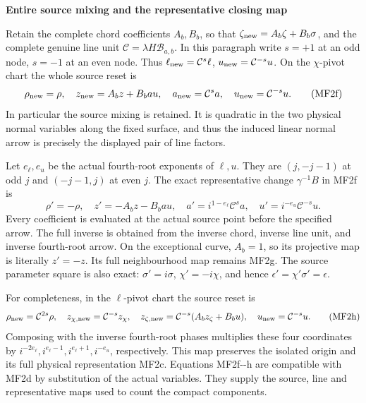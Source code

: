 \par

\medskip\noindent\textbf{Entire source mixing and the representative closing map}

\par\nobreak

Retain the complete chord coefficients \(A_b,B_b\), so that
\(\zeta_{\rm new}=A_b\zeta+B_b\sigma\), and the complete genuine
line unit \(\mathcal C=\lambda H\mathcal B_{a,b}\). In this
paragraph write \(s=+1\) at an odd node, \(s=-1\) at an even
node. Thus \(\ell_{\rm new}=\mathcal C^s\ell\),
\(u_{\rm new}=\mathcal C^{-s}u\). On the \(\chi\)-pivot chart
the whole source reset is
\[
 \rho_{\rm new}=\rho,\quad
 z_{\rm new}=A_bz+B_bau,\quad
 a_{\rm new}=\mathcal C^s a,\quad
 u_{\rm new}=\mathcal C^{-s}u.
\tag{MF2f}
\]
In particular the source mixing is retained. It is quadratic in the two
physical normal variables along the fixed surface, and thus the induced
linear normal arrow is precisely the displayed pair of line factors.

Let \(e_\ell,e_u\) be the actual fourth-root exponents of \(\ell,u\).
They are \((j,-j-1)\) at odd \(j\) and \((-j-1,j)\) at even
\(j\). The exact representative change \(\gamma^{-1}B\) in
MF2f is
\[
 \rho'=-\rho,\quad z'=-A_bz-B_bau,\quad
 a'=i^{1-e_\ell}\mathcal C^s a,\quad
 u'=i^{-e_u}\mathcal C^{-s}u.
\tag{MF2g}
\]
Every coefficient is evaluated at the actual source point before the
specified arrow. The full inverse is obtained from the inverse chord,
inverse line unit, and inverse fourth-root arrow. On the exceptional
curve, \(A_b=1\), so its projective map is literally \(z'=-z\).
Its full neighbourhood map remains MF2g. The source parameter square is
also exact: \(\sigma'=i\sigma\), \(\chi'=-i\chi\), and hence
\(\epsilon'=\chi'\sigma'=\epsilon\).

For completeness, in the \(\ell\)-pivot chart the source reset is
\[
 \rho_{\rm new}=\mathcal C^{2s}\rho,\quad
 z_{\chi,{\rm new}}=\mathcal C^{-s}z_\chi,\quad
 z_{\zeta,{\rm new}}=\mathcal C^{-s}(A_bz_\zeta+B_bu),\quad
 u_{\rm new}=\mathcal C^{-s}u.
\tag{MF2h}
\]
Composing with the inverse fourth-root phases multiplies these four
coordinates by \(i^{-2e_\ell},i^{e_\ell-1},i^{e_\ell+1},
i^{-e_u}\), respectively. This map preserves the isolated origin
and its full physical representation MF2c. Equations MF2f-\/-h are
compatible with MF2d by substitution of the actual variables. They
supply the source, line and representative maps used to count the
compact components.

\par

